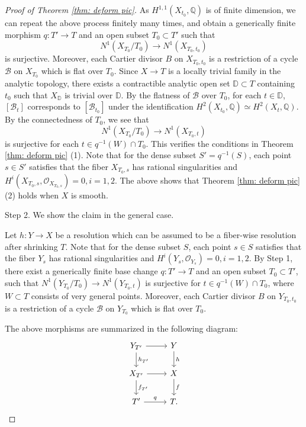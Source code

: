 \documentclass[11pt,oneside,reqno]{amsart}
\numberwithin{equation}{section}
\theoremstyle{definition}
\newcommand{\bD}{\mathbb{D}}
\newcommand{\bQ}{\mathbb{Q}}
\newcommand{\mB}{\mathcal{B}}
\newcommand{\mO}{\mathcal{O}}
\begin{document}
\begin{proof}[Proof of Theorem \ref{thm: deform pic}]
As $H^{1,1}(X_{t_0}, \bQ)$ is of finite dimension, we can repeat the above process finitely many times, and obtain a generically finite morphism $q: T' \to T$ and an open subset $T_0 \subset T'$ such that 
\[
N^1(X_{T_0}/T_0) \to N^1(X_{T_0,t_0})
\] is surjective. Moreover, each Cartier divisor $B$ on $X_{T_0,t_0}$ is a restriction of a cycle $\mB$ on $X_{T_0}$ which is flat over $T_0$. Since $X \to T$ is a locally trivial family in the analytic topology, there exists a contractible analytic open set $\bD \subset T$ containing $t_0$ such that $X_{\bD}$ is trivial over $\bD$. By the flatness of $\mB$ over $T_0$, for each $t\in \bD$, $[\mB_t]$ corresponds to $[\mB_{t_0}]$ under the identification $H^2(X_{t_0}, \bQ) \simeq H^2(X_{t}, \bQ)$. By the connectedness of $T_0$, we see that
\[
N^1(X_{T_0}/T_0) \to N^1(X_{T_0,t})
\] is surjective for each $t\in q^{-1}(W)\cap T_0$. This verifies the conditions in Theorem \ref{thm: deform pic} (1). Note that for the dense subset $S' = q^{-1}(S)$, each point $s \in S'$ satisfies that the fiber $X_{T_0, s}$ has rational singularities and $H^i(X_{T_0, s}, \mO_{X_{T_0, s}}) = 0, i = 1, 2$. The above shows that Theorem \ref{thm: deform pic} (2) holds when $X$ is smooth.

Step 2. We show the claim in the general case. 

Let $h: Y \to X$ be a resolution which can be assumed to be a fiber-wise resolution after shrinking $T$. Note that for the dense subset $S$, each point $s \in S$ satisfies that the fiber $Y_s$ has rational singularities and $H^i(Y_s, \mO_{Y_s}) = 0, i = 1, 2$. By Step 1, there exist a generically finite base change $q: T' \to T$ and an open subset $T_0 \subset T'$, such that $N^1(Y_{T_0}/T_0) \to N^1(Y_{T_0,t})$ is surjective for $t\in q^{-1}(W)\cap T_0$, where $W\subset T$ consists of very general points. Moreover, each Cartier divisor $B$ on $Y_{T_0,t_0}$ is a restriction of a cycle $\mB$ on $Y_{T_0}$ which is flat over $T_0$. 

The above morphisms are summarized in the following diagram:
\[
	\begin{tikzcd}
	 Y_{T'}\arrow[d,"h_{T'}"] \arrow[r] &Y \arrow[d, "h"] \\
	 X_{T'} \arrow[d,"f_{T'}"] \arrow[r]  &X \arrow[d, "f"]\\
     T' \arrow[r,"q"] & T.
	\end{tikzcd}
\] 


\end{proof}
\end{document}
